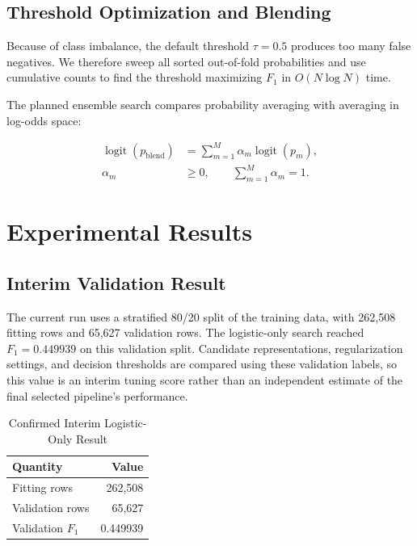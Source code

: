 \documentclass[10pt,conference,compsocconf]{IEEEtran}
\begin{document}
\subsection{Threshold Optimization and Blending}

Because of class imbalance, the default threshold $\tau=0.5$ produces too many
false negatives. We therefore sweep all sorted out-of-fold probabilities and
use cumulative counts to find the threshold maximizing $F_1$ in
$O(N\log N)$ time.

The planned ensemble search compares probability averaging with averaging
in log-odds space:

\begin{equation}
\begin{aligned}
\operatorname{logit}(p_{\mathrm{blend}})
&=\sum_{m=1}^{M}\alpha_m\operatorname{logit}(p_m),\\
\alpha_m&\geq0,\qquad
\sum_{m=1}^{M}\alpha_m=1 .
\end{aligned}
\label{eq:blend}
\end{equation}

\section{Experimental Results}

\subsection{Interim Validation Result}

The current run uses a stratified 80/20 split of the training data, with
262,508 fitting rows and 65,627 validation rows. The logistic-only search
reached $F_1=0.449939$ on this validation split. Candidate representations,
regularization settings, and decision thresholds are compared using these
validation labels, so this value is an interim tuning score rather than an
independent estimate of the final selected pipeline's performance.

\begin{table}[t]
\centering
\caption{Confirmed Interim Logistic-Only Result}
\label{tab:interim}
\begin{tabular}{lr}
\toprule
\textbf{Quantity} & \textbf{Value} \\
\midrule
Fitting rows & 262,508 \\
Validation rows & 65,627 \\
Validation $F_1$ & 0.449939 \\
\bottomrule
\end{tabular}
\end{table}
\end{document}
